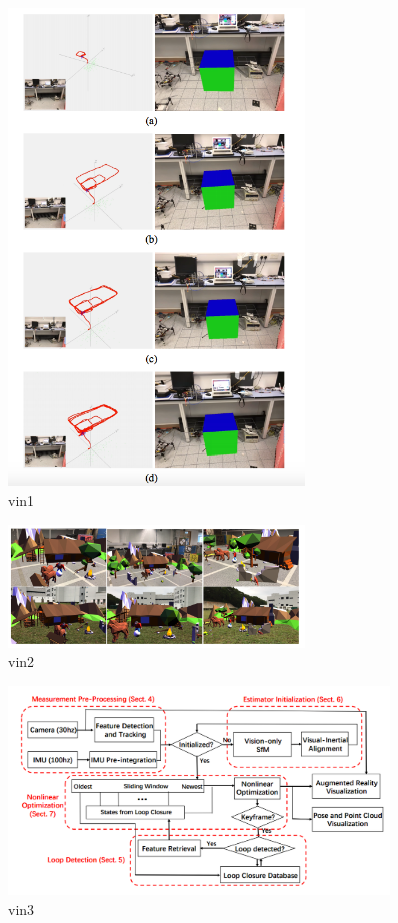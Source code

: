 \documentclass[12pt,twoside]{article}
\begin{document}
\begin{figure}[h]
    \centering
    \includegraphics[width=0.7\textwidth]{figures/vin1}
    \caption{vin1}
    \label{fig: vin1}
\end{figure}

\begin{figure}[h]
    \centering
    \includegraphics[width=0.7\textwidth]{figures/vin2}
    \caption{vin2}
    \label{fig: vin2}
\end{figure}


\begin{figure}[h]
    \centering
    \includegraphics[width=0.9\textwidth]{figures/vin3}
    \caption{vin3}
    \label{fig: vin3}
\end{figure}
\end{document}
